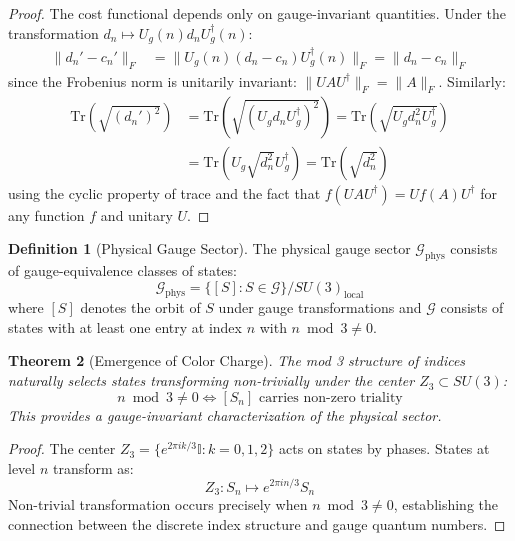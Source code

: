 \documentclass[11pt]{article}
\numberwithin{equation}{section}
\newtheorem{theorem}{Theorem}[section]
\theoremstyle{definition}
\newtheorem{definition}[theorem]{Definition}
\theoremstyle{remark}
\begin{document}
\begin{proof}
The cost functional depends only on gauge-invariant quantities. Under the transformation $d_n \mapsto U_g(n) d_n U_g^\dagger(n)$:
\begin{align}
\|d_n' - c_n'\|_F &= \|U_g(n)(d_n - c_n)U_g^\dagger(n)\|_F = \|d_n - c_n\|_F
\end{align}
since the Frobenius norm is unitarily invariant: $\|UAU^\dagger\|_F = \|A\|_F$. Similarly:
\begin{align}
\text{Tr}(\sqrt{(d_n')^2}) &= \text{Tr}(\sqrt{(U_g d_n U_g^\dagger)^2}) = \text{Tr}(\sqrt{U_g d_n^2 U_g^\dagger}) \\
&= \text{Tr}(U_g \sqrt{d_n^2} U_g^\dagger) = \text{Tr}(\sqrt{d_n^2})
\end{align}
using the cyclic property of trace and the fact that $f(UAU^\dagger) = Uf(A)U^\dagger$ for any function $f$ and unitary $U$.
\end{proof}

\begin{definition}[Physical Gauge Sector]
The physical gauge sector $\mathcal{G}_{\text{phys}}$ consists of gauge-equivalence classes of states:
\begin{equation}
\mathcal{G}_{\text{phys}} = \{[S] : S \in \mathcal{G}\} / SU(3)_{\text{local}}
\end{equation}
where $[S]$ denotes the orbit of $S$ under gauge transformations and $\mathcal{G}$ consists of states with at least one entry at index $n$ with $n \bmod 3 \neq 0$.
\end{definition}

\begin{theorem}[Emergence of Color Charge]
The mod 3 structure of indices naturally selects states transforming non-trivially under the center $Z_3 \subset SU(3)$:
\begin{equation}
n \bmod 3 \neq 0 \iff [S_n] \text{ carries non-zero triality}
\end{equation}
This provides a gauge-invariant characterization of the physical sector.
\end{theorem}

\begin{proof}
The center $Z_3 = \{e^{2\pi i k/3} \mathbb{I} : k = 0,1,2\}$ acts on states by phases. States at level $n$ transform as:
\begin{equation}
Z_3: S_n \mapsto e^{2\pi i n/3} S_n
\end{equation}
Non-trivial transformation occurs precisely when $n \bmod 3 \neq 0$, establishing the connection between the discrete index structure and gauge quantum numbers.
\end{proof}
\end{document}
